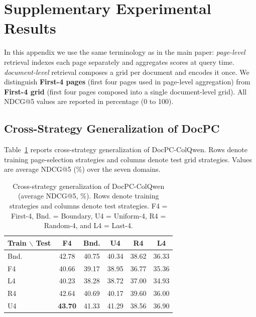 \section{Supplementary Experimental Results}
\label{sec:appendix-results}

In this appendix we use the same terminology as in the main paper: \emph{page-level} retrieval indexes each page separately and aggregates scores at query time. \emph{document-level} retrieval composes a grid per document and encodes it once. We distinguish \textbf{First-4 pages} (first four pages used in page-level aggregation) from \textbf{First-4 grid} (first four pages composed into a single document-level grid). All NDCG@5 values are reported in percentage (0 to 100).


\subsection{Cross-Strategy Generalization of DocPC}
\label{sec:app-a2}

Table~\ref{tab:app-a3} reports cross-strategy generalization of DocPC-ColQwen. Rows denote training page-selection strategies and columns denote test grid strategies. Values are average NDCG@5 (\%) over the seven domains.

\begin{table}[htbp]
  \centering
  \footnotesize
  \setlength{\tabcolsep}{4pt}
  \caption{Cross-strategy generalization of DocPC-ColQwen (average NDCG@5, \%). Rows denote training strategies and columns denote test strategies. F4 = First-4, Bnd. = Boundary, U4 = Uniform-4, R4 = Random-4, and L4 = Last-4.}
  \label{tab:app-a3}
  \begin{tabular}{@{}lccccc@{}}
    \toprule
    Train $\backslash$ Test & F4 & Bnd. & U4 & R4 & L4 \\
    \midrule
    Bnd. & 42.78 & 40.75 & 40.34 & 38.62 & 36.33 \\
    F4   & 40.66 & 39.17 & 38.95 & 36.77 & 35.36 \\
    L4   & 40.23 & 38.28 & 38.72 & 37.00 & 34.93 \\
    R4   & 42.64 & 40.69 & 40.17 & 39.60 & 36.00 \\
    U4   & \textbf{43.70} & 41.33 & 41.29 & 38.56 & 36.90 \\
    \bottomrule
  \end{tabular}
\end{table}

